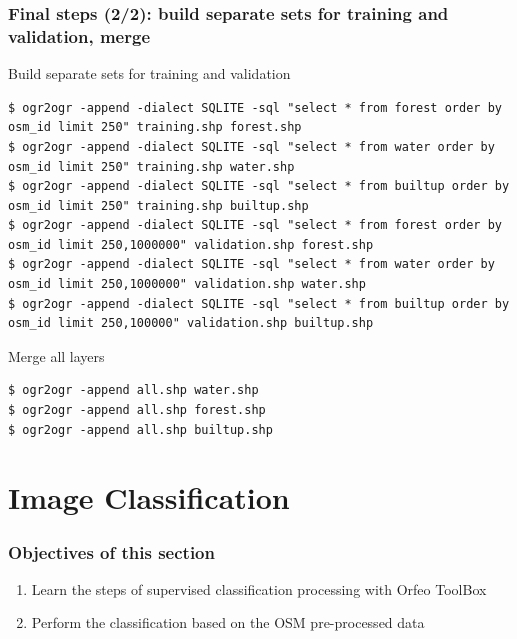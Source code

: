 \documentclass[8pt]{beamer}
\begin{document}
\begin{frame}[fragile]
\frametitle{Final steps (2/2): build separate sets for training and validation, merge}

\begin{block}{Build separate sets for training and validation}
\begin{scriptsize}
\begin{verbatim}
$ ogr2ogr -append -dialect SQLITE -sql "select * from forest order by osm_id limit 250" training.shp forest.shp
$ ogr2ogr -append -dialect SQLITE -sql "select * from water order by osm_id limit 250" training.shp water.shp
$ ogr2ogr -append -dialect SQLITE -sql "select * from builtup order by osm_id limit 250" training.shp builtup.shp
$ ogr2ogr -append -dialect SQLITE -sql "select * from forest order by osm_id limit 250,1000000" validation.shp forest.shp
$ ogr2ogr -append -dialect SQLITE -sql "select * from water order by osm_id limit 250,1000000" validation.shp water.shp
$ ogr2ogr -append -dialect SQLITE -sql "select * from builtup order by osm_id limit 250,100000" validation.shp builtup.shp
\end{verbatim}
\end{scriptsize}
\end{block}

\begin{block}{Merge all layers}
\begin{scriptsize}
\begin{verbatim}
$ ogr2ogr -append all.shp water.shp
$ ogr2ogr -append all.shp forest.shp
$ ogr2ogr -append all.shp builtup.shp
\end{verbatim}
\end{scriptsize}
\end{block}
\end{frame}

\section{Image Classification}

\begin{frame}
\frametitle{Objectives of this section}

\begin{enumerate}
\item Learn the steps of supervised classification processing with Orfeo ToolBox
\item Perform the classification based on the OSM pre-processed data
\end{enumerate}

\end{frame}
\end{document}
